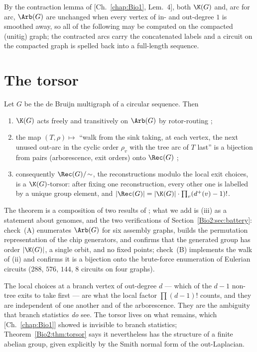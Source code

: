 By the contraction lemma of [Ch.~\ref{chap:Bio1}, Lem.~4], both $\K(G)$ and, arc for arc, $\Arb(G)$
are unchanged when every vertex of in- and out-degree $1$ is smoothed away, so all of the
following may be computed on the compacted (unitig) graph; the contracted arcs carry the
concatenated labels and a circuit on the compacted graph is spelled back into a
full-length sequence.

\section{The torsor}\label{Bio2:sec:torsor}

\begin{theorem}\label{Bio2:thm:torsor}
Let $G$ be the de Bruijn multigraph of a circular sequence. Then
\begin{enumerate}
\item[(i)] $\K(G)$ acts freely and transitively on $\Arb(G)$ by rotor-routing
{\rm\cite[Lem.~3.12, 3.13, 3.17]{HLMPPW}};
\item[(ii)] the map $(T,\rho)\mapsto$ ``walk from the sink taking, at each vertex, the
next unused out-arc in the cyclic order $\rho_v$ with the tree arc of $T$ last'' is a
bijection from pairs (arborescence, exit orders) onto $\Rec(G)$
{\rm\cite[Cor.~4.10]{HLMPPW}};
\item[(iii)] consequently $\Rec(G)/\!\sim$, the reconstructions modulo the local exit
choices, is a $\K(G)$-torsor: after fixing one reconstruction, every other one is labelled
by a unique group element, and $|\Rec(G)|=|\K(G)|\cdot\prod_v(d^+(v)-1)!$.
\end{enumerate}
\end{theorem}

The theorem is a composition of two results of \cite{HLMPPW}; what we add is (iii) as a
statement about genomes, and the two verifications of Section~\ref{Bio2:sec:battery}: check~(A)
enumerates $\Arb(G)$ for six assembly graphs, builds the permutation representation of the
chip generators, and confirms that the generated group has order $|\K(G)|$, a single orbit,
and no fixed points; check~(B) implements the walk of (ii) and confirms it is a bijection
onto the brute-force enumeration of Eulerian circuits ($288$, $576$, $144$, $8$ circuits on
four graphs).

\begin{remark}\label{Bio2:rem:quotient}
The local choices at a branch vertex of out-degree $d$ --- which of the $d-1$ non-tree
exits to take first --- are what the local factor $\prod(d-1)!$ counts, and they are
independent of one another and of the arborescence. They are the ambiguity that branch
statistics \emph{do} see. The torsor lives on what remains, which [Ch.~\ref{chap:Bio1}] showed is
invisible to branch statistics; Theorem~\ref{Bio2:thm:torsor} says it nevertheless has the
structure of a finite abelian group, given explicitly by the Smith normal form of the
out-Laplacian.
\end{remark}

